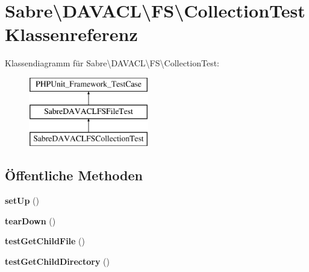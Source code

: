 \hypertarget{class_sabre_1_1_d_a_v_a_c_l_1_1_f_s_1_1_collection_test}{}\section{Sabre\textbackslash{}D\+A\+V\+A\+CL\textbackslash{}FS\textbackslash{}Collection\+Test Klassenreferenz}
\label{class_sabre_1_1_d_a_v_a_c_l_1_1_f_s_1_1_collection_test}
Klassendiagramm für Sabre\textbackslash{}D\+A\+V\+A\+CL\textbackslash{}FS\textbackslash{}Collection\+Test\+:\begin{figure}[H]
\begin{center}
\leavevmode
\includegraphics[height=3.000000cm]{class_sabre_1_1_d_a_v_a_c_l_1_1_f_s_1_1_collection_test}
\end{center}
\end{figure}
\subsection*{Öffentliche Methoden}
\begin{DoxyCompactItemize}
\item 
\mbox{\label{class_sabre_1_1_d_a_v_a_c_l_1_1_f_s_1_1_collection_test_a8da880d227e44f6fa1bd59aac51263cd}} 
{\bfseries set\+Up} ()
\item 
\mbox{\label{class_sabre_1_1_d_a_v_a_c_l_1_1_f_s_1_1_collection_test_a5fe9b60add2fa876ed8bb50c9bac6e78}} 
{\bfseries tear\+Down} ()
\item 
\mbox{\label{class_sabre_1_1_d_a_v_a_c_l_1_1_f_s_1_1_collection_test_a060dec6c5dc58aa013db16b618f59f00}} 
{\bfseries test\+Get\+Child\+File} ()
\item 
\mbox{\label{class_sabre_1_1_d_a_v_a_c_l_1_1_f_s_1_1_collection_test_ab5af90dd76338b17a534e7eed9cf9a78}} 
{\bfseries test\+Get\+Child\+Directory} ()
\end{DoxyCompactItemize}
